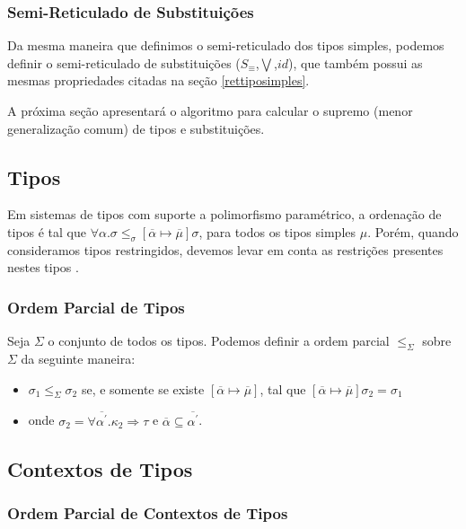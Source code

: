 \subsubsection{Semi-Reticulado de Substitui\c{c}\~oes}

Da mesma maneira que definimos o semi-reticulado dos tipos simples, podemos definir o semi-reticulado de 
substitui\c{c}\~oes ($S_{\equiv}$,$\bigvee$,$id$), que tamb\'em possui as mesmas propriedades citadas na se\c{c}\~ao 
\ref{rettiposimples}. 

A pr\'oxima se\c{c}\~ao apresentar\'a o algoritmo para calcular o supremo (menor generaliza\c{c}\~ao comum) de tipos e
substitui\c{c}\~oes.

\subsection{Tipos}

Em sistemas de tipos com suporte a polimorfismo param\'etrico, a ordena\c{c}\~ao de tipos \'e tal que 
$\forall\alpha.\sigma\leq_{\sigma}[\overline{\alpha}\mapsto\overline{\mu}]\sigma$, para todos os tipos simples $\mu$. 
Por\'em, quando consideramos tipos restringidos, devemos levar em conta as restri\c{c}\~oes presentes nestes tipos 
\cite{Faxen03, Camarao99a}. 

\subsubsection{Ordem Parcial de Tipos}\label{typeinstance}

Seja $\Sigma$ o conjunto de todos os tipos. Podemos definir a ordem parcial $\leq_{\Sigma}$ sobre 
$\Sigma$ da seguinte maneira:
\begin{itemize}
	\item[\ ] $\sigma_{1}\leq_{\Sigma}\sigma_{2}$ se, e somente se existe 
	           $[\overline{\alpha}\mapsto\overline{\mu}]$, tal que 
	           $[\overline{\alpha}\mapsto\overline{\mu}]\sigma_{2}=\sigma_{1}$
	\item[\ ] onde $\sigma_{2}=\forall\overline{\alpha^{\prime}}.\kappa_{2}\Rightarrow\tau$ e 
	          $\overline{\alpha}\subseteq\overline{\alpha^{\prime}}$.
\end{itemize}


\subsection{Contextos de Tipos}

\subsubsection{Ordem Parcial de Contextos de Tipos}

